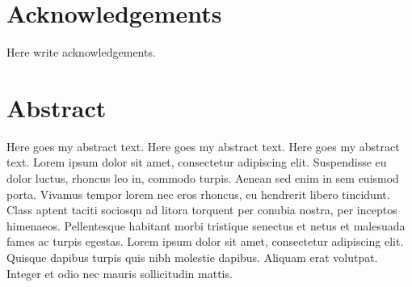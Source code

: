 \documentclass[
  12pt,
  a4paper,
  openany]{scrbook}
\renewcommand*\contentsname{Table of contents}
\newcommand\contentsname{Table of contents}
\renewcommand*\listfigurename{List of Figures}
\newcommand\listfigurename{List of Figures}
\renewcommand*\listtablename{List of Tables}
\newcommand\listtablename{List of Tables}
\begin{document}
% 
% 
% 

\let\mainmatterreal\mainmatter
\let\mainmatter\relax

\renewcommand*\contentsname{Table of contents}
\hypersetup{linkcolor=}
\setcounter{tocdepth}{1}
\renewcommand*\listfigurename{List of figures}
\renewcommand*\listtablename{List of tables}

\mainmatter
{}

\chapter*{Acknowledgements}\label{acknowledgements}


Here write acknowledgements.


\chapter*{Abstract}\label{abstract}


Here goes my abstract text. Here goes my abstract text. Here goes my
abstract text. Lorem ipsum dolor sit amet, consectetur adipiscing elit.
Suspendisse eu dolor luctus, rhoncus leo in, commodo turpis. Aenean sed
enim in sem euismod porta. Vivamus tempor lorem nec eros rhoncus, eu
hendrerit libero tincidunt. Class aptent taciti sociosqu ad litora
torquent per conubia nostra, per inceptos himenaeos. Pellentesque
habitant morbi tristique senectus et netus et malesuada fames ac turpis
egestas. Lorem ipsum dolor sit amet, consectetur adipiscing elit.
Quisque dapibus turpis quis nibh molestie dapibus. Aliquam erat
volutpat. Integer et odio nec mauris sollicitudin mattis.
\end{document}

